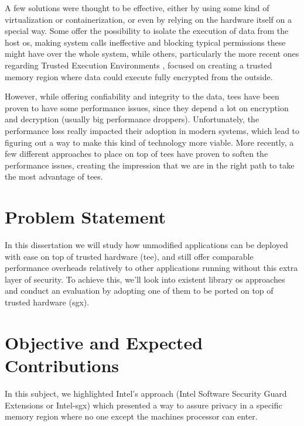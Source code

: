 A few solutions were thought to be effective, either by using some kind of virtualization or containerization, or even by relying on the hardware itself on a special way. 
Some \cite{virtGhostPaper}\cite{flickerPaper}\cite{mushiPaper}\cite{SeCagePaper}\cite{inkTagPaper}\cite{segoPaper} offer the possibility to isolate the execution of data from the host \gls{os}, making system calls ineffective and blocking typical permissions these might have over the whole system, while others, particularly the more recent ones regarding Trusted Execution Environments \cite{armTZPaper}\cite{amdPaper}\cite{sanctumPaper}\cite{intelSGX}, focused on creating a trusted memory region where data could execute fully encrypted from the outside. 

However, while offering confiability and integrity to the data, \gls{tee}s have been proven to have some performance issues, since they depend a lot on encryption and decryption (usually big performance droppers). Unfortunately, the performance loss really impacted their adoption in modern systems, which lead to figuring out a way to make this kind of technology more viable. 
More recently, a few different approaches to place on top of \gls{tee}s have proven to soften the performance issues, creating the impression that we are in the right path to take the most advantage of \gls{tee}s. 


\section{Problem Statement}

In this dissertation we will study how unmodified applications can be deployed with ease on top of trusted hardware (\gls{tee}), and still offer comparable performance overheads relatively to other applications running without this extra layer of security. To achieve this, we'll look into existent library \gls{os} approaches and conduct an evaluation by adopting one of them to be ported on top of trusted hardware (\gls{sgx}). 




\section{Objective and Expected Contributions} %
\label{sec:disclaimer}

In this subject, we highlighted Intel’s approach (Intel Software Security Guard Extensions or Intel-\gls{sgx}) which presented a way to assure privacy in a specific memory region where no one except the machines processor can enter. 

